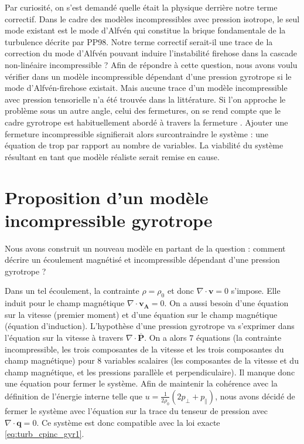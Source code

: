  Par curiosité, on s'est demandé quelle était la physique derrière notre terme correctif. Dans le cadre des modèles incompressibles avec pression isotrope, le seul mode existant est le mode d'Alfvén qui constitue la brique fondamentale de la turbulence  décrite par PP98. Notre terme correctif serait-il une trace de la correction du mode d'Alfvén pouvant induire l'instabilité firehose dans la cascade non-linéaire incompressible ?  Afin de répondre à cette question, nous avons voulu vérifier dans un modèle incompressible dépendant d'une pression gyrotrope si le mode d'Alfvén-firehose existait. Mais aucune trace d'un modèle incompressible avec pression tensorielle n'a été trouvée dans la littérature. Si l'on approche le problème sous un autre angle, celui des fermetures, on se rend compte que le cadre gyrotrope est habituellement abordé à travers la fermeture . Ajouter une fermeture incompressible signifierait alors surcontraindre le système : une équation de trop par rapport au nombre de variables. La viabilité du système résultant en tant que modèle réaliste serait remise en cause. 

\section{Proposition d'un modèle incompressible gyrotrope}
\label{sec-222}

Nous avons construit un nouveau modèle en partant de la question : comment décrire un écoulement magnétisé et incompressible dépendant d'une pression gyrotrope ? 

 Dans un tel écoulement, la contrainte  $\rho = \rho_0$ et donc $\nabla \cdot \boldsymbol{v}=0$ s'impose. Elle induit pour le champ magnétique $\nabla \cdot \boldsymbol{v_A} = 0$. On a aussi besoin d'une équation sur la vitesse (premier moment) et d'une équation sur le champ magnétique (équation d'induction). L'hypothèse d'une pression gyrotrope va s'exprimer dans l'équation sur la vitesse à travers $\nabla \cdot \overline{\boldsymbol{P}}$. On a alors $\num{7}$ équations (la contrainte incompressible, les trois composantes de la vitesse et les trois composantes du champ magnétique) pour $\num{8}$ variables scalaires (les composantes de la vitesse et du champ magnétique, et les pressions parallèle et perpendiculaire). Il manque donc une équation pour fermer le système. Afin de maintenir la cohérence avec la définition de l'énergie interne telle que $u = \frac{1}{2 \rho_0} (2p_{\perp} + p_{\parallel}) $, nous avons décidé de fermer le système avec l'équation sur la trace du tenseur de pression avec $\nabla \cdot \boldsymbol{q} = 0$. Ce système est donc compatible avec la loi exacte \eqref{eq:turb_cpinc_gyr1}.

